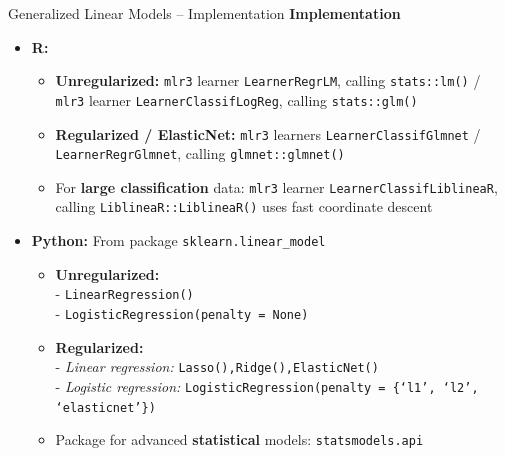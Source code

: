 \documentclass[11pt,compress,t,notes=noshow, xcolor=table]{beamer}
\newcommand{\highlight}[1]{\textcolor{hlcol}{\textbf{#1}}}
\begin{document}
\begin{vbframe}{Generalized Linear Models -- Implementation}
  \highlight{Implementation}

\begin{itemize}
  \item \textbf{R:}
  \begin{itemize}
    \item \textbf{Unregularized:} \texttt{mlr3} learner \texttt{LearnerRegrLM}, 
    calling \texttt{stats::lm()} / \texttt{mlr3} learner 
    \texttt{LearnerClassifLogReg}, calling \texttt{stats::glm()}
    \item \textbf{Regularized / ElasticNet:} \texttt{mlr3} learners 
    \texttt{LearnerClassifGlmnet} / 
    \texttt{LearnerRegrGlmnet}, calling \texttt{glmnet::glmnet()}
    \item For \textbf{large classification} data: \texttt{mlr3} learner     
    \texttt{LearnerClassifLiblineaR}, calling \texttt{LiblineaR::LiblineaR()} uses fast coordinate descent
  \end{itemize}
  \item \textbf{Python:} From package \texttt{sklearn.linear\_model} 
  \begin{itemize}
    \item \textbf{Unregularized:}\\ 
    - \texttt{LinearRegression()}\\
    - \texttt{LogisticRegression(penalty = None)}
    \item \textbf{Regularized:}\\
    - \textit{Linear regression:} \texttt{Lasso(),Ridge(),ElasticNet()} \\
    - \textit{Logistic regression:} \texttt{LogisticRegression(penalty = \{‘l1’, ‘l2’, ‘elasticnet’\})}
    \item Package for advanced \textbf{statistical} models: \texttt{statsmodels.api} 
  \end{itemize}
\end{itemize}

  
\end{vbframe}
\end{document}
